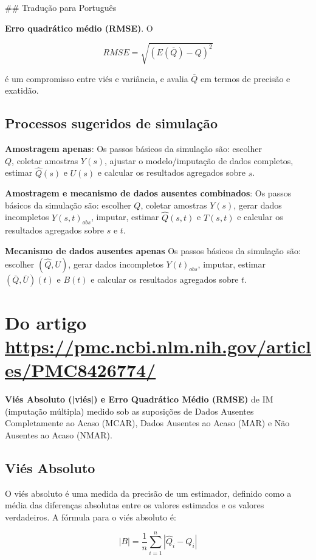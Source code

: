 \documentclass[11pt]{article}
\begin{document}
\#\# Tradução para Português

\textbf{Erro quadrático médio (RMSE)}. O

$$
RMSE = \sqrt{(E(\overline{Q}) - Q)^2}
$$

é um compromisso entre viés e variância, e avalia  $\overline{Q}$   em termos de precisão e exatidão.

\subsection*{Processos sugeridos de simulação}
\textbf{Amostragem apenas}: Os passos básicos da simulação são: escolher\\
$Q$, coletar amostras  $Y(s)$, ajustar o modelo/imputação de dados completos, estimar  $\hat{Q}(s)$  e  $U(s)$  e calcular os resultados agregados sobre  $s$.

\textbf{Amostragem e mecanismo de dados ausentes combinados}: Os passos básicos da simulação são: escolher  $Q$, coletar amostras  $Y(s)$, gerar dados incompletos  $Y(s,t)_{obs}$, imputar, estimar  $\hat{Q}(s,t)$  e  $T(s,t)$  e calcular os resultados agregados sobre  $s$  e  $t$.

\textbf{Mecanismo de dados ausentes apenas} Os passos básicos da simulação são: escolher  $(\hat{Q}, U)$, gerar dados incompletos  $Y(t)_{obs}$, imputar, estimar  $(\overline{Q}, \overline{U})(t)$  e  $B(t)$  e calcular os resultados agregados sobre  $t$.

\section*{Do artigo \href{https://pmc.ncbi.nlm.nih.gov/articles/PMC8426774/}{https://pmc.ncbi.nlm.nih.gov/articles/PMC8426774/}}
\textbf{Viés Absoluto (|viés|) e Erro Quadrático Médio (RMSE)} de IM (imputação múltipla) medido sob as suposições de Dados Ausentes Completamente ao Acaso (MCAR), Dados Ausentes ao Acaso (MAR) e Não Ausentes ao Acaso (NMAR).

\subsection*{Viés Absoluto}
O viés absoluto é uma medida da precisão de um estimador, definido como a média das diferenças absolutas entre os valores estimados e os valores verdadeiros. A fórmula para o viés absoluto é:

$$
| B| = \frac{1}{n} \sum_{i=1}^{n} | \hat{Q}_i - Q_i |
$$
\end{document}
